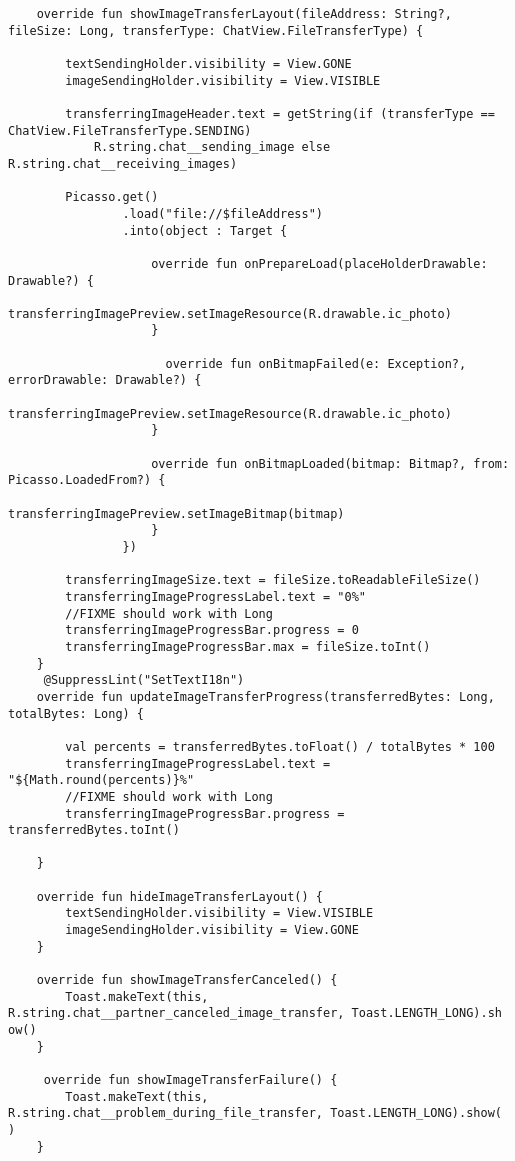 \begin{lstlisting}
	override fun showImageTransferLayout(fileAddress: String?, fileSize: Long, transferType: ChatView.FileTransferType) {

        textSendingHolder.visibility = View.GONE
        imageSendingHolder.visibility = View.VISIBLE

        transferringImageHeader.text = getString(if (transferType == ChatView.FileTransferType.SENDING)
            R.string.chat__sending_image else R.string.chat__receiving_images)

        Picasso.get()
                .load("file://$fileAddress")
                .into(object : Target {

                    override fun onPrepareLoad(placeHolderDrawable: Drawable?) {
                        transferringImagePreview.setImageResource(R.drawable.ic_photo)
                    }

					  override fun onBitmapFailed(e: Exception?, errorDrawable: Drawable?) {
                        transferringImagePreview.setImageResource(R.drawable.ic_photo)
                    }

                    override fun onBitmapLoaded(bitmap: Bitmap?, from: Picasso.LoadedFrom?) {
                        transferringImagePreview.setImageBitmap(bitmap)
                    }
                })

        transferringImageSize.text = fileSize.toReadableFileSize()
        transferringImageProgressLabel.text = "0%"
        //FIXME should work with Long
        transferringImageProgressBar.progress = 0
        transferringImageProgressBar.max = fileSize.toInt()
    }
	 @SuppressLint("SetTextI18n")
    override fun updateImageTransferProgress(transferredBytes: Long, totalBytes: Long) {

        val percents = transferredBytes.toFloat() / totalBytes * 100
        transferringImageProgressLabel.text = "${Math.round(percents)}%"
        //FIXME should work with Long
        transferringImageProgressBar.progress = transferredBytes.toInt()

    }

    override fun hideImageTransferLayout() {
        textSendingHolder.visibility = View.VISIBLE
        imageSendingHolder.visibility = View.GONE
    }

    override fun showImageTransferCanceled() {
        Toast.makeText(this, R.string.chat__partner_canceled_image_transfer, Toast.LENGTH_LONG).sh
ow()
    }

	 override fun showImageTransferFailure() {
        Toast.makeText(this, R.string.chat__problem_during_file_transfer, Toast.LENGTH_LONG).show(
)
    }


\end{lstlisting}
